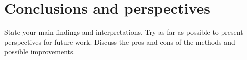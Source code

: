\documentclass[english, a4paper]{report}
\begin{document}
\section{Conclusions and perspectives}
State your main findings and interpretations. Try as far as possible to present perspectives for future work. Discuss the pros and cons of the methods and possible improvements.


\newpage


\end{document}
